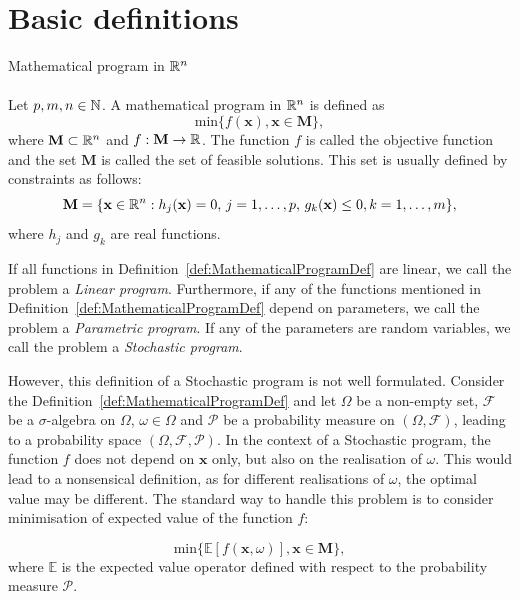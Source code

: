 \section{Basic definitions}
\begin{defn}{Mathematical program in $\mathbb{R}^n$} \label{def:MathematicalProgramDef} \\
\cite[p. 107]{dupacovastochasticprogramming} \\
Let $p,m,n \in \mathbb{N}$. A mathematical program in $\mathbb{R}^n$ is defined as
\begin{equation*}
\mathrm{min} \{f(\mathbf{x}), \mathbf{x} \in \mathbf{M}\},
\end{equation*}
where $\mathbf{M} \subset \mathbb{R}^n$ and $f:\mathbf{M} \rightarrow \mathbb{R}$. The function $f$ is called the objective function and the set $\mathbf{M}$ is called the set of feasible solutions.
This set is usually defined by constraints as follows:
\begin{equation*}
	\mathbf{M} = \{\mathbf{x} \in \mathbb{R}^n: h_j(\mathbf{x})=0, \, j=1,\dots,p, \, g_k(\mathbf{x}) \leq 0, k=1,\dots,m \},
\end{equation*}
where $h_j$ and $g_k$ are real functions.
\end{defn}
If all functions in Definition~\ref{def:MathematicalProgramDef} are linear, we call the problem a \textit{Linear program}.
Furthermore, if any of the functions mentioned in Definition~\ref{def:MathematicalProgramDef} depend on parameters, we call the problem a \textit{Parametric program}. If any of the parameters are random variables, we call the problem a \textit{Stochastic program}.


However, this definition of a Stochastic program is not well formulated. Consider the Definition~\ref{def:MathematicalProgramDef} and let $\Omega$ be a non-empty set, $\mathcal{F}$ be a  $\sigma$-algebra on $\Omega$, $\omega \in \Omega$ and $\mathcal{P}$ be a probability measure on $(\Omega, \mathcal{F})$, leading to a probability space $(\Omega, \mathcal{F}, \mathcal{P})$. In the context of a Stochastic program, the function $f$ does not depend on $\mathbf{x}$ only, but also on the realisation of $\omega$. This would lead to a nonsensical definition, as for different realisations of $\omega$, the optimal value may be different. The standard way to handle this problem is to consider minimisation of expected value of the function $f$:

\begin{equation*}
\mathrm{min} \{\mathbb{E}\left[f(\mathbf{x}, \omega)\right], \mathbf{x} \in \mathbf{M}\},
\end{equation*}
where $\mathbb{E}$ is the expected value operator defined with respect to the probability measure $\mathcal{P}$. 


